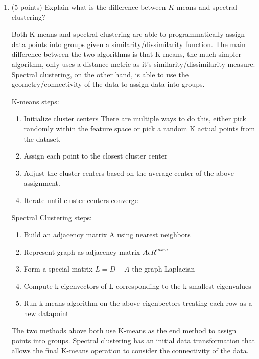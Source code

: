\documentclass[a4paper,12pt,fleqn]{article}
\begin{document}
\begin{enumerate}

\item (5 points) Explain what is the difference between $K$-means and spectral clustering? 
\vspace{.15in}

Both K-means and spectral clustering are able to programmatically assign data points into groups given a similarity/dissimilarity function.  The main difference between the two algorithms is that K-means, the much simpler algorithm, only uses a distance metric as it's similarity/dissimilarity measure. Spectral clustering, on the other hand, is able to use the geometry/connectivity of the data to assign data into groups. 

 
K-means steps:
\begin{enumerate}[label=(\roman*)]
\item  Initialize cluster centers
There are multiple ways to do this, either pick randomly within the feature space or pick a random K actual points from the dataset.

\item Assign each point to the closest cluster center 
\item Adjust the cluster centers based on the average center of the above assignment.
\item Iterate until cluster centers converge

\end{enumerate}

Spectral Clustering steps:
\begin{enumerate}[label=(\roman*)]
\item Build an adjacency matrix A using nearest neighbors
\item Represent graph as adjacency matrix $A \epsilon R^{mxm}$
\item Form a special matrix $L=D-A$ the graph Laplacian
\item Compute k eigenvectors of L corresponding to the k smallest eigenvalues
\item Run k-means algorithm on the above eigenbectors treating each row as a new datapoint
\end{enumerate}

The two methods above both use K-means as the end method to assign points into groups.  Spectral clustering has an initial data transformation that allows the final K-means operation to consider the connectivity of the data.
\vspace{.15in}




\end{enumerate}
\end{document}
